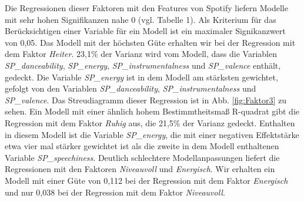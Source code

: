 Die Regressionen dieser Faktoren mit den Features von Spotify liefern Modelle mit sehr hohen Signifikanzen nahe 0 (vgl. Tabelle 1).
Als Kriterium für das Berücksichtigen einer Variable für ein Modell ist ein maximaler Signikanzwert von  0,05.  
Das Modell mit der höchsten Güte erhalten wir bei der Regression mit dem Faktor \textit{Heiter}.
23,1\% der Varianz wird vom Modell, dass die Variablen \textit{SP\_danceability}, \textit{SP\_energy}, \textit{SP\_instrumentalness} und \textit{SP\_valence} enthält, gedeckt.
Die Variable \textit{SP\_energy} ist in dem Modell am stärksten gewichtet, gefolgt von den Variablen \textit{SP\_danceability},  \textit{SP\_instrumentalness} und \textit{SP\_valence}.
Das Streudiagramm dieser Regression ist in Abb. \ref{fig:Faktor3} zu sehen.    
Ein Modell mit einer ähnlich hohem Bestimmtheitsmaß R-quadrat gibt die Regression mit dem Faktor \textit{Ruhig} aus, die 21,5\% der Varianz gedeckt.
Enthalten in diesem Modell ist die Variable \textit{SP\_energy}, die mit einer negativen Effektstärke etwa vier mal stärker gewichtet ist als die zweite in dem Modell enthaltenen Variable \textit{SP\_speechiness}.
Deutlich schlechtere Modellanpassungen liefert die Regressionen mit den Faktoren \textit{Niveauvoll} und \textit{Energisch}.
Wir erhalten ein Modell mit einer Güte von 0,112 bei der Regression mit dem Faktor \textit{Energisch} und nur 0,038 bei der Regression mit dem Faktor \textit{Niveauvoll}.

